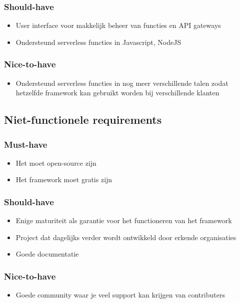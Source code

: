 \subsubsection{Should-have}
\begin{itemize}
    \item User interface voor makkelijk beheer van functies en API gateways
    \item Ondersteund serverless functies in Javascript, NodeJS
\end{itemize}
\subsubsection{Nice-to-have}
\begin{itemize}
    \item Ondersteund serverless functies in nog meer verschillende talen zodat hetzelfde framework kan gebruikt worden bij verschillende klanten
\end{itemize}
\subsection{Niet-functionele requirements}
\subsubsection{Must-have}
\begin{itemize}
    \item Het moet open-source zijn
    \item Het framework moet gratis zijn
\end{itemize}
\subsubsection{Should-have}
\begin{itemize}
    \item Enige maturiteit als garantie voor het functioneren van het framework
    \item Project dat dagelijks verder wordt ontwikkeld door erkende organisaties
    \item Goede documentatie
\end{itemize}
\subsubsection{Nice-to-have}
\begin{itemize}
    \item Goede community waar je veel support kan krijgen van contributers
\end{itemize}


